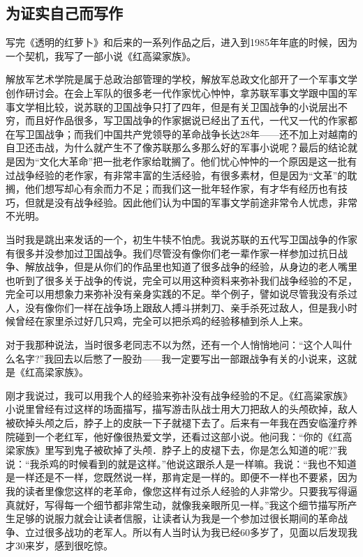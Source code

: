 \documentclass[fontset=fandol,12pt,a5paper]{ctexbook}
\begin{document}
\subsection{为证实自己而写作}

写完《透明的红萝卜》和后来的一系列作品之后，进入到1985年年底的时候，因为一个契机，我写了一部小说《红高粱家族》。

解放军艺术学院是属于总政治部管理的学校，解放军总政文化部开了一个军事文学创作研讨会。在会上军队的很多老一代作家忧心忡忡，拿苏联军事文学跟中国的军事文学相比较，说苏联的卫国战争只打了四年，但是有关卫国战争的小说层出不穷，而且好作品很多，写卫国战争的作家据说已经出了五代，一代又一代的作家都在写卫国战争；而我们中国共产党领导的革命战争长达28年——还不加上对越南的自卫还击战，为什么就产生不了像苏联那么多那么好的军事小说呢？最后的结论就是因为“文化大革命”把一批老作家给耽搁了。他们忧心忡忡的一个原因是这一批有过战争经验的老作家，有非常丰富的生活经验，有很多素材，但是因为“文革”的耽搁，他们想写却心有余而力不足；而我们这一批年轻作家，有才华有经历也有技巧，但就是没有战争经验。因此他们认为中国的军事文学前途非常令人忧虑，非常不光明。

当时我是跳出来发话的一个，初生牛犊不怕虎。我说苏联的五代写卫国战争的作家有很多并没参加过卫国战争。我们尽管没有像你们老一辈作家一样参加过抗日战争、解放战争，但是从你们的作品里也知道了很多战争的经验，从身边的老人嘴里也听到了很多关于战争的传说，完全可以用这种资料来弥补我们战争经验的不足，完全可以用想象力来弥补没有亲身实践的不足。举个例子，譬如说尽管我没有杀过人，没有像你们一样在战争场上跟敌人搏斗拼刺刀、亲手杀死过敌人，但是我小时候曾经在家里杀过好几只鸡，完全可以把杀鸡的经验移植到杀人上来。

对于我那种说法，当时很多老同志不以为然，还有一个人悄悄地问：“这个人叫什么名字?”我回去以后憋了一股劲——我一定要写出一部跟战争有关的小说来，这就是《红高梁家族》。

刚才我说过，我可以用我个人的经验来弥补没有战争经验的不足。《红高粱家族》小说里曾经有过这样的场面描写，描写游击队战士用大刀把敌人的头颅砍掉，敌人被砍掉头颅之后，脖子上的皮肤一下子就褪下去了。后来有一年我在西安临潼疗养院碰到一个老红军，他好像很热爱文学，还看过这部小说。他问我：“你的《红高梁家族》里写到鬼子被砍掉了头颅．脖子上的皮褪下去，你是怎么知道的呢?”我说：“我杀鸡的时候看到的就是这样。”他说这跟杀人是一样嘛。我说：“我也不知道是一样还是不一样，您既然说一样，那肯定是一样的。即便不一样也不要紧，因为我的读者里像您这样的老革命，像您这样有过杀人经验的人非常少。只要我写得逼真就好，写得每一个细节都非常生动，就像我亲眼所见一样。”我这个细节描写所产生足够的说服力就会让读者信服，让读者认为我是一个参加过很长期间的革命战争、立过很多战功的老军人。所以有人当时认为我已经60多岁了，见面以后发现我才30来岁，感到很吃惊。
\end{document}
